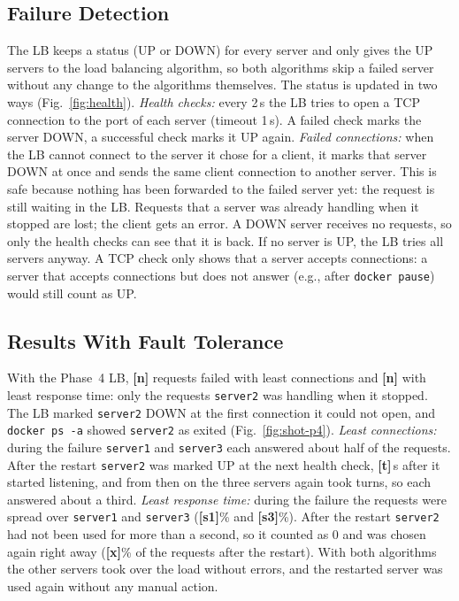 \subsection{Failure Detection}
The LB keeps a status (UP or DOWN) for every server and only gives the UP servers to
the load balancing algorithm, so both algorithms skip a failed server without any
change to the algorithms themselves. The status is updated in two ways
(Fig.~\ref{fig:health}). \emph{Health checks:} every 2\,s the LB tries to open a TCP
connection to the port of each server (timeout 1\,s). A failed check marks the server
DOWN, a successful check marks it UP again. \emph{Failed connections:} when the LB
cannot connect to the server it chose for a client, it marks that server DOWN at once
and sends the same client connection to another server. This is safe because nothing
has been forwarded to the failed server yet: the request is still waiting in the LB.
Requests that a server was already handling when it stopped are lost; the client gets
an error. A DOWN server receives no requests, so only the health checks can see that
it is back. If no server is UP, the LB tries all servers anyway. A TCP check only shows
that a server accepts connections: a server that accepts connections but does not
answer (e.g., after \texttt{docker pause}) would still count as UP.

\subsection{Results With Fault Tolerance}
With the Phase~4 LB, \textbf{[n]} requests failed with least connections and
\textbf{[n]} with least response time: only the requests \texttt{server2} was handling
when it stopped. The LB marked \texttt{server2} DOWN at the first connection it could
not open, and \texttt{docker ps -a} showed \texttt{server2} as exited
(Fig.~\ref{fig:shot-p4}). \emph{Least connections:} during the failure
\texttt{server1} and \texttt{server3} each answered about half of the requests. After
the restart \texttt{server2} was marked UP at the next health check, \textbf{[t]}\,s
after it started listening, and from then on the three servers again took turns, so
each answered about a third. \emph{Least response time:} during the failure the
requests were spread over \texttt{server1} and \texttt{server3}
(\textbf{[s1]}\% and \textbf{[s3]}\%). After the restart \texttt{server2} had not been
used for more than a second, so it counted as 0 and was chosen again right away
(\textbf{[x]}\% of the requests after the restart). With both algorithms the other
servers took over the load without errors, and the restarted server was used again
without any manual action.

